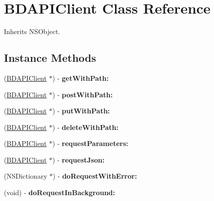 \hypertarget{interface_b_d_a_p_i_client}{\section{B\-D\-A\-P\-I\-Client Class Reference}
\label{interface_b_d_a_p_i_client}
}


Inherits N\-S\-Object.

\subsection*{Instance Methods}
\begin{DoxyCompactItemize}
\item 
\hypertarget{interface_b_d_a_p_i_client_ab39f971362a50d6061d40206dae5e13f}{(\hyperlink{interface_b_d_a_p_i_client}{B\-D\-A\-P\-I\-Client} $\ast$) -\/ {\bfseries get\-With\-Path\-:}}\label{interface_b_d_a_p_i_client_ab39f971362a50d6061d40206dae5e13f}

\item 
\hypertarget{interface_b_d_a_p_i_client_a9a78061d590e95733a42ce96916cd649}{(\hyperlink{interface_b_d_a_p_i_client}{B\-D\-A\-P\-I\-Client} $\ast$) -\/ {\bfseries post\-With\-Path\-:}}\label{interface_b_d_a_p_i_client_a9a78061d590e95733a42ce96916cd649}

\item 
\hypertarget{interface_b_d_a_p_i_client_ace9aaee7d6ffb2ffe003ec35bf140d98}{(\hyperlink{interface_b_d_a_p_i_client}{B\-D\-A\-P\-I\-Client} $\ast$) -\/ {\bfseries put\-With\-Path\-:}}\label{interface_b_d_a_p_i_client_ace9aaee7d6ffb2ffe003ec35bf140d98}

\item 
\hypertarget{interface_b_d_a_p_i_client_a1b87003ed632957208b7273b34ddf85e}{(\hyperlink{interface_b_d_a_p_i_client}{B\-D\-A\-P\-I\-Client} $\ast$) -\/ {\bfseries delete\-With\-Path\-:}}\label{interface_b_d_a_p_i_client_a1b87003ed632957208b7273b34ddf85e}

\item 
\hypertarget{interface_b_d_a_p_i_client_a56886042590299cce0145ce63d864971}{(\hyperlink{interface_b_d_a_p_i_client}{B\-D\-A\-P\-I\-Client} $\ast$) -\/ {\bfseries request\-Parameters\-:}}\label{interface_b_d_a_p_i_client_a56886042590299cce0145ce63d864971}

\item 
\hypertarget{interface_b_d_a_p_i_client_ab4afe3a65ad089f8ca88a59fe2d56b55}{(\hyperlink{interface_b_d_a_p_i_client}{B\-D\-A\-P\-I\-Client} $\ast$) -\/ {\bfseries request\-Json\-:}}\label{interface_b_d_a_p_i_client_ab4afe3a65ad089f8ca88a59fe2d56b55}

\item 
\hypertarget{interface_b_d_a_p_i_client_afae23fe6afbad45784f180492aca65a1}{(N\-S\-Dictionary $\ast$) -\/ {\bfseries do\-Request\-With\-Error\-:}}\label{interface_b_d_a_p_i_client_afae23fe6afbad45784f180492aca65a1}

\item 
\hypertarget{interface_b_d_a_p_i_client_ad80308d6154d4ac52b3d6fd3386c5990}{(void) -\/ {\bfseries do\-Request\-In\-Background\-:}}\label{interface_b_d_a_p_i_client_ad80308d6154d4ac52b3d6fd3386c5990}

\end{DoxyCompactItemize}
